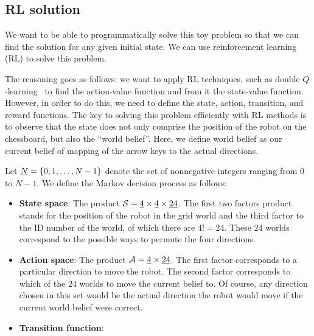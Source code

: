 \subsection{RL solution}
\label{ssec:rl_sol}
%
We want to be able to programmatically solve this toy problem so that we can 
find the solution for any given initial state. We can use reinforcement learning
(RL) to solve this problem. 

The reasoning goes as follows: we want to apply RL techniques, such as double
$Q$-learning~\cite{morales2020grokking} to find the action-value function and
from it the state-value function. However, in order to do this, we need to
define the state, action, transition, and reward functions. The key to solving 
this problem efficiently with RL methods is to observe that the state does not 
only comprise the position of the robot on the chessboard, but also the ``world 
belief''. Here, we define world belief as our current belief of mapping of the 
arrow keys to the actual directions.

Let $\uline{N} = \{0, 1, \ldots, N-1\}$ denote the set of nonnegative integers ranging from $0$ to $N-1$. We define the Markov decision process as follows:

\begin{itemize}
\item \textbf{State space}: The product $\mc{S} = \uline{4} \times \uline{4}
\times \uline{24}$. The first two factors product stands for the position of the
robot in the grid world and the third factor to the ID number of the world, of
which there are $4! = 24$. These $24$ worlds correspond to the possible ways to
permute the four directions.
\item \textbf{Action space}: The product $\mc{A} = \uline{4} \times \uline{24}$.
The first factor corresponds to a particular direction to move the robot. The
second factor corresponds to which of the $24$ worlds to move the current belief
to. Of course, any direction chosen in this set would be the actual direction
the robot would move if the current world belief were correct.
\item \textbf{Transition function}: 
\end{itemize}
